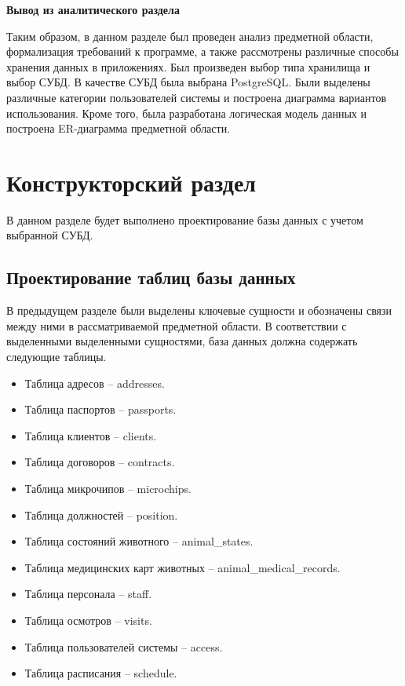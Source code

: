 \documentclass[a4paper,14pt]{article}
\begin{document}
\newpage
\textbf{Вывод из аналитического раздела}

Таким образом, в данном разделе был проведен анализ предметной области, формализация требований к программе, а также рассмотрены различные способы хранения данных в приложениях. Был произведен выбор типа хранилища и выбор СУБД. В качестве СУБД была выбрана PostgreSQL. Были выделены различные категории пользователей системы и построена диаграмма вариантов использования. Кроме того, была разработана логическая модель данных и построена ER-диаграмма предметной области.

\newpage
\section{Конструкторский раздел}

В данном разделе будет выполнено проектирование базы данных с учетом выбранной СУБД.

\subsection{Проектирование таблиц базы данных}

В предыдущем разделе были выделены ключевые сущности и обозначены связи между ними в рассматриваемой предметной области. В соответствии с выделенными выделенными сущностями, база данных должна содержать следующие таблицы.

\begin{itemize}
	\item Таблица адресов -- addresses.
	\item Таблица паспортов -- passports.
	\item Таблица клиентов -- clients.
	\item Таблица договоров -- contracts.
	\item Таблица микрочипов -- microchips.
	\item Таблица должностей -- position.
	\item Таблица состояний животного -- animal\_states.
	\item Таблица медицинских карт животных -- animal\_medical\_records.
	\item Таблица персонала -- staff.
	\item Таблица осмотров -- visits.
	\item Таблица пользователей системы -- access.
	\item Таблица расписания -- schedule.
\end{itemize}
\end{document}
